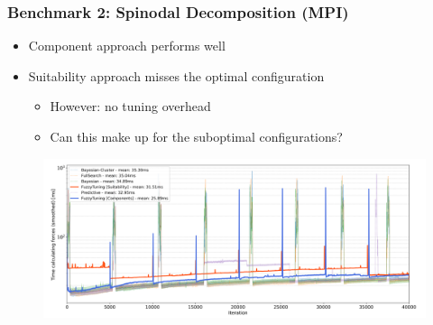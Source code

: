\documentclass[
	10pt,
	t		%
]{beamer}
\begin{document}
\begin{frame}
	\frametitle{Benchmark 2: Spinodal Decomposition (MPI)}
	
	\begin{itemize}
		\item Component approach performs well
		\item Suitability approach misses the optimal configuration
		      \begin{itemize}
			      \item However: no tuning overhead
			      \item Can this make up for the suboptimal configurations?
		      \end{itemize}
	\end{itemize}
	
	\vspace{-0.1cm}
	
	\begin{figure}
		\centering
		\includegraphics[width=1\textwidth]{figures/spinodal-timings.png}
	\end{figure}
\end{frame}
\end{document}
